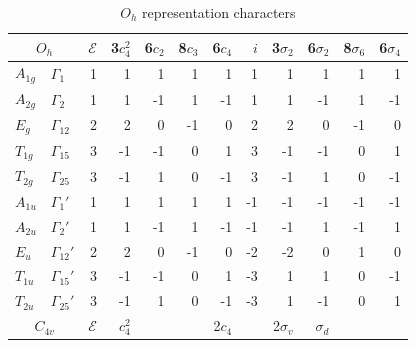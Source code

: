 \documentclass[twocolumn,showpacs,preprintnumbers,superscriptaddress,prb,floatfix,aps,10pt]{revtex4-1}
\newcommand*{\id}{\mathcal{E}}
\begin{document}
\begin{table}
\caption{\label{table:chartab} $O_h$ representation characters}
\begin{ruledtabular}
\begin{tabular*}{10cm}{llrrrrrrrrrr}
\multicolumn{2}{c}{$O_h$}         &$\id$&3$c_4^2$& 6$c_2$ & 8$c_3$ & 6$c_4$ &  $i$ & 3$\sigma_2$ & 6$\sigma_2$ & 8$\sigma_6$ & 6$\sigma_4$ \\  
\hline
$A_{1g}$        & $\Gamma_{1}  $  &  1  &     1  &     1  &     1  &     1  &   1  &          1  &          1  &          1  &          1  \\         %
$A_{2g}$        & $\Gamma_{2}  $  &  1  &     1  &    -1  &     1  &    -1  &   1  &          1  &         -1  &          1  &         -1  \\         %
$E_g   $        & $\Gamma_{12} $  &  2  &     2  &     0  &    -1  &     0  &   2  &          2  &          0  &         -1  &          0  \\         %
$T_{1g}$        & $\Gamma_{15} $  &  3  &    -1  &    -1  &     0  &     1  &   3  &         -1  &         -1  &          0  &          1  \\         %
$T_{2g}$        & $\Gamma_{25} $  &  3  &    -1  &     1  &     0  &    -1  &   3  &         -1  &          1  &          0  &         -1  \\         %
$A_{1u}$        & $\Gamma_{1} '$  &  1  &     1  &     1  &     1  &     1  &  -1  &         -1  &         -1  &         -1  &         -1  \\         %
$A_{2u}$        & $\Gamma_{2} '$  &  1  &     1  &    -1  &     1  &    -1  &  -1  &         -1  &          1  &         -1  &          1  \\         %
$E_u   $        & $\Gamma_{12}'$  &  2  &     2  &     0  &    -1  &     0  &  -2  &         -2  &          0  &          1  &          0  \\         %
$T_{1u}$        & $\Gamma_{15}'$  &  3  &    -1  &    -1  &     0  &     1  &  -3  &          1  &          1  &          0  &         -1  \\         %
$T_{2u}$        & $\Gamma_{25}'$  &  3  &    -1  &     1  &     0  &    -1  &  -3  &          1  &         -1  &          0  &          1  \\ \hline \hline %
\multicolumn{2}{c}{$C_{4v}$}      &$\id$& $c_4^2$&        &        & 2$c_4$ &      & 2$\sigma_v$ &  $\sigma_d$ &             &             \\ 

\end{tabular*}
\end{ruledtabular}
\end{table}
\end{document}
